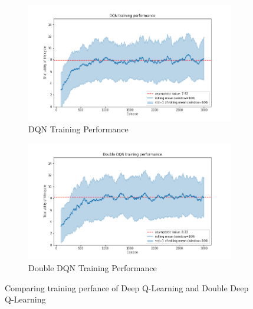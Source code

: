 \begin{figure}[ht]
\begin{subfigure}{.5\textwidth}
  \centering
  \includegraphics[width=1\linewidth]{figures/dqn_training_performance_simple_model.png}
  \caption{DQN Training Performance}
  \label{fig:dqn_training_performance_simple}
\end{subfigure}%
\begin{subfigure}{.5\textwidth}
  \centering
  \includegraphics[width=1\linewidth]{figures/ddqn_training_performance_simple_model.png}
  \caption{Double DQN Training Performance}
  \label{fig:ddqn_training_performance_simple}
\end{subfigure}
    \caption{Comparing training perfance of Deep Q-Learning and Double Deep Q-Learning}
    \label{fig:training_performance_simple_model}
\end{figure}


